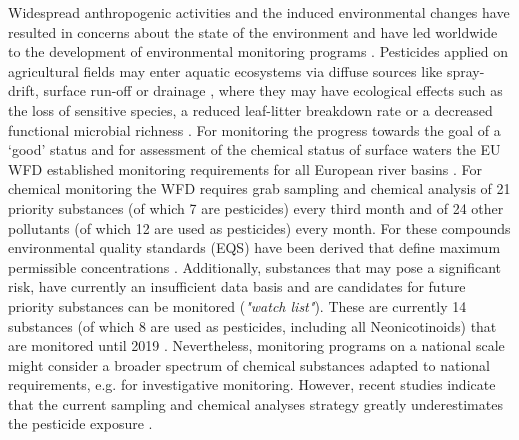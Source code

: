 Widespread anthropogenic activities and the induced environmental changes have resulted in concerns about the state of the environment and have led worldwide to the development of environmental monitoring programs \citep{nichols_monitoring_2006}. 
Pesticides applied on agricultural fields may enter aquatic ecosystems via diffuse sources like spray-drift, surface run-off or drainage \citep{schulz_field_2004, stehle_probabilistic_2013, liess_determination_1999, carter_how_2000}, where they may have ecological effects such as the loss of sensitive species, a reduced leaf-litter breakdown rate or a decreased functional microbial richness \citep{liess_analyzing_2005, schafer_effects_2007, schafer_effects_2012}.
For monitoring the progress towards the goal of a `good' status and for assessment of the chemical status of surface waters the EU WFD established monitoring requirements for all European river basins \citep{european_union_directive_2000}. 
For chemical monitoring the WFD requires grab sampling and chemical analysis of 21 priority substances (of which 7 are pesticides) every third month and of 24 other pollutants (of which 12 are used as pesticides) every month.
For these compounds environmental quality standards (EQS) have been derived that define maximum permissible concentrations \citep{european_union_directive_2013}. 
Additionally, substances that may pose a significant risk, have currently an insufficient data basis and are candidates for future priority substances can be monitored (\emph{"watch list"}).
These are currently 14 substances (of which 8 are used as pesticides, including all Neonicotinoids) that are monitored until 2019 \citep{european_union_commission_2015}.
Nevertheless, monitoring programs on a national scale might consider a broader spectrum of chemical substances adapted to national requirements, e.g. for investigative monitoring.
However, recent studies indicate that the current sampling and chemical analyses strategy greatly underestimates the pesticide exposure \citep{stehle_probabilistic_2013, xing_influences_2013, moschet_how_2014}. 

